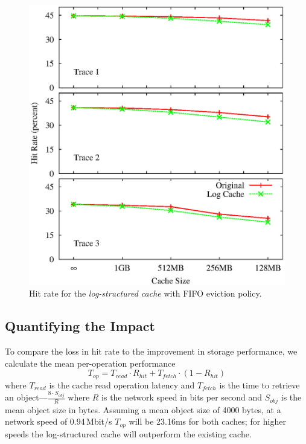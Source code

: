 \documentclass[letterpaper,twocolumn,10pt]{article}
\begin{document}
\begin{figure}[t]
  \begin{center}
    \includegraphics[width=1.04\columnwidth]{graphs/hit-rate-2}
  \end{center}
  \caption{Hit rate for the \emph{log-structured cache} with FIFO eviction
    policy.}
  \label{fig:hit-rate} 
\vspace{-0.2in}
\end{figure}

\subsection{Quantifying the Impact}
To compare the loss in hit rate to the improvement in storage performance, we
calculate the mean per-operation performance
\begin{equation}
T_{op} = T_{read}\cdot R_{hit} + T_{fetch}\cdot (1-R_{hit})
\end{equation}
where $T_{read}$ is the cache read operation latency and $T_{fetch}$ is the time
to retrieve an object---$\frac{8\cdot S_{obj}}{R}$ where $R$ is the network
speed in bits per second and $S_{obj}$ is the mean object size in bytes.
Assuming a mean object size of 4000 bytes, at a network speed of 0.94\,Mbit/s
$T_{op}$ will be 23.16ms for both caches; for higher speeds the log-structured
cache will outperform the existing cache.
\end{document}
